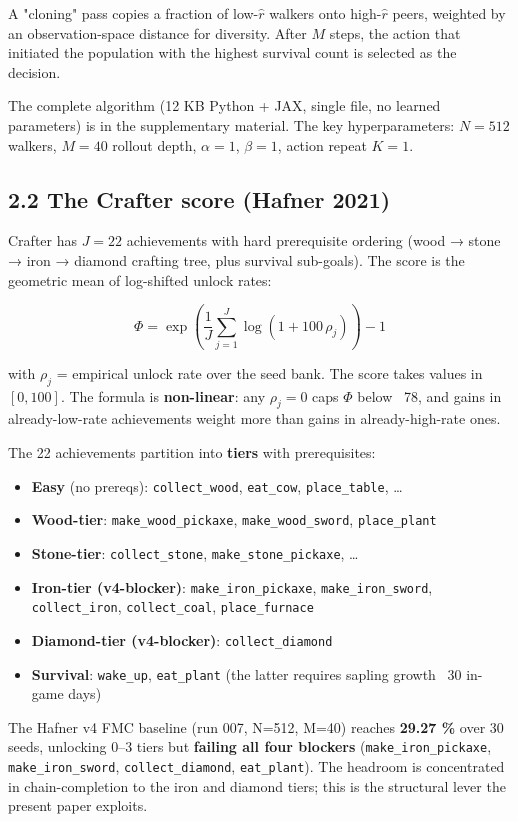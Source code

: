 A "cloning" pass copies a fraction of low-$\widehat{r}$ walkers onto
high-$\widehat{r}$ peers, weighted by an observation-space distance for
diversity. After $M$ steps, the action that initiated the population
with the highest survival count is selected as the decision.

The complete algorithm (12 KB Python + JAX, single file, no learned
parameters) is in the supplementary material. The key
hyperparameters: $N = 512$ walkers, $M = 40$ rollout depth, $\alpha = 1$,
$\beta = 1$, action repeat $K = 1$.

\subsection{2.2 The Crafter score (Hafner 2021)}

Crafter has $J = 22$ achievements with hard prerequisite ordering
(wood → stone → iron → diamond crafting tree, plus survival sub-goals).
The score is the geometric mean of log-shifted unlock rates:

\[
\Phi = \exp\!\left( \frac{1}{J} \sum_{j=1}^{J} \log(1 + 100\, \rho_j) \right) - 1
\]

with $\rho_j$ = empirical unlock rate over the seed bank. The score
takes values in $[0, 100]$. The formula is \textbf{non-linear}: any
$\rho_j = 0$ caps $\Phi$ below ~78, and gains in already-low-rate
achievements weight more than gains in already-high-rate ones.

The 22 achievements partition into \textbf{tiers} with prerequisites:

\begin{itemize}
\item \textbf{Easy} (no prereqs): \texttt{collect\_wood}, \texttt{eat\_cow}, \texttt{place\_table}, …
\item \textbf{Wood-tier}: \texttt{make\_wood\_pickaxe}, \texttt{make\_wood\_sword}, \texttt{place\_plant}
\item \textbf{Stone-tier}: \texttt{collect\_stone}, \texttt{make\_stone\_pickaxe}, …
\item \textbf{Iron-tier (v4-blocker)}: \texttt{make\_iron\_pickaxe}, \texttt{make\_iron\_sword}, \texttt{collect\_iron}, \texttt{collect\_coal}, \texttt{place\_furnace}
\item \textbf{Diamond-tier (v4-blocker)}: \texttt{collect\_diamond}
\item \textbf{Survival}: \texttt{wake\_up}, \texttt{eat\_plant} (the latter requires sapling growth ~30 in-game days)
\end{itemize}
The Hafner v4 FMC baseline (run 007, N=512, M=40) reaches \textbf{29.27 \%}
over 30 seeds, unlocking 0–3 tiers but \textbf{failing all four blockers}
(\texttt{make\_iron\_pickaxe}, \texttt{make\_iron\_sword}, \texttt{collect\_diamond}, \texttt{eat\_plant}).
The headroom is concentrated in chain-completion to the iron and
diamond tiers; this is the structural lever the present paper exploits.

